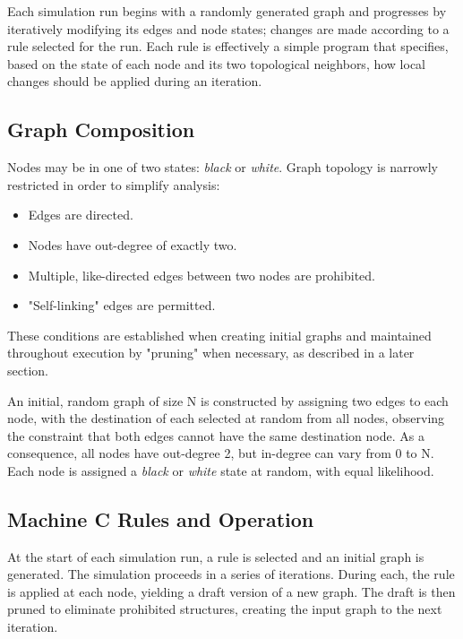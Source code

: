 \documentclass[twoside,twocolumn]{article}
\begin{document}
Each simulation run begins with a randomly generated graph and progresses by
iteratively modifying its edges and node states; changes are made according to a rule selected
for the run. Each rule is effectively a simple program  that specifies, based on the state
of each node and its two topological neighbors, how local changes should be applied during an
iteration.

\subsection{Graph Composition}

Nodes may be in one of two states: \textit{black} or \textit{white}.
Graph topology is narrowly restricted in order to simplify analysis:

\begin{itemize}
    \item Edges are directed.
    \item Nodes have out-degree of exactly two.
    \item Multiple, like-directed edges between two nodes are prohibited.
    \item "Self-linking" edges are permitted.
\end{itemize}

These conditions are established when creating initial graphs and maintained
throughout execution by "pruning" when necessary, as described in a later section.

An initial, random graph of size N is constructed by assigning two edges to each node, with
the destination of each selected at random from all nodes, observing the
constraint that both edges cannot have the same destination node. As a consequence,
all nodes have out-degree 2, but in-degree can vary from 0 to N. Each node is assigned
a \textit{black} or \textit{white} state at random, with equal likelihood.

\subsection{Machine \textbf{C} Rules and Operation}

At the start of each simulation run, a rule is selected and an initial graph
is generated.  The simulation proceeds in a series of
iterations. During each, the rule is applied at each node, yielding a draft
version of a new graph. The draft is then pruned to eliminate
prohibited structures, creating the input graph to the next iteration.
\end{document}
